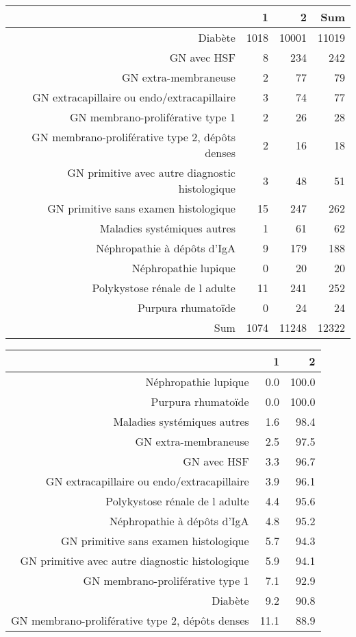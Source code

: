 \documentclass[11pt,a4paper]{article}\usepackage[]{graphicx}\usepackage[]{color}
\begin{document}
\begin{table}[ht]
\centering
\begin{tabular}{rrrr}
  \hline
 & 1 & 2 & Sum \\ 
  \hline
Diabète & 1018 & 10001 & 11019 \\ 
  GN avec HSF & 8 & 234 & 242 \\ 
  GN extra-membraneuse & 2 & 77 & 79 \\ 
  GN extracapillaire ou endo/extracapillaire & 3 & 74 & 77 \\ 
  GN membrano-proliférative type 1 & 2 & 26 & 28 \\ 
  GN membrano-proliférative type 2, dépôts denses & 2 & 16 & 18 \\ 
  GN primitive avec autre diagnostic histologique & 3 & 48 & 51 \\ 
  GN primitive sans examen histologique & 15 & 247 & 262 \\ 
  Maladies systémiques autres & 1 & 61 & 62 \\ 
  Néphropathie à dépôts d'IgA & 9 & 179 & 188 \\ 
  Néphropathie lupique & 0 & 20 & 20 \\ 
  Polykystose rénale de l adulte & 11 & 241 & 252 \\ 
  Purpura rhumatoïde & 0 & 24 & 24 \\ 
  Sum & 1074 & 11248 & 12322 \\ 
   \hline
\end{tabular}
\end{table}
\begin{table}[H]
\centering
\begin{tabular}{rrr}
  \hline
 & 1 & 2 \\ 
  \hline
Néphropathie lupique & 0.0 & 100.0 \\ 
  Purpura rhumatoïde & 0.0 & 100.0 \\ 
  Maladies systémiques autres & 1.6 & 98.4 \\ 
  GN extra-membraneuse & 2.5 & 97.5 \\ 
  GN avec HSF & 3.3 & 96.7 \\ 
  GN extracapillaire ou endo/extracapillaire & 3.9 & 96.1 \\ 
  Polykystose rénale de l adulte & 4.4 & 95.6 \\ 
  Néphropathie à dépôts d'IgA & 4.8 & 95.2 \\ 
  GN primitive sans examen histologique & 5.7 & 94.3 \\ 
  GN primitive avec autre diagnostic histologique & 5.9 & 94.1 \\ 
  GN membrano-proliférative type 1 & 7.1 & 92.9 \\ 
  Diabète & 9.2 & 90.8 \\ 
  GN membrano-proliférative type 2, dépôts denses & 11.1 & 88.9 \\ 
   \hline
\end{tabular}
\end{table}
\end{document}

